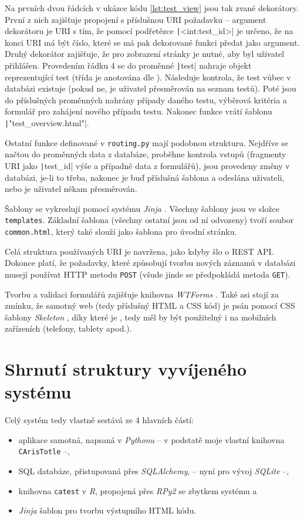 \documentclass[a4paper,twoside,12pt]{scrbook}
\begin{document}
Na prvních dvou řádcích v ukázce kódu \ref{lst:test_view} jsou tak zvané dekorátory. První z nich zajišťuje propojení s příslušnou URI požadavku -- argument dekorátoru je URI s tím, že pomocí podřetězce \texttt|<int:test_id>| je určeno, že na konci URI má být číslo, které se má pak dekorované funkci předat jako argument. Druhý dekorátor zajišťuje, že pro zobrazení stránky je nutné, aby byl uživatel přihlášen. Provedením řádku 4 se do proměnné \texttt|test| nahraje objekt reprezentující test (třída je anotována dle \cite{PEP484}). Následuje kontrola, že test vůbec v databázi existuje (pokud ne, je uživatel přesměrován na seznam testů). Poté jsou do příslušných proměnných nahrány případy daného testu, výběrová kritéria a formulář pro zahájení nového případu testu. Nakonec funkce vrátí  šablonu \texttt|"test_overview.html"|.

Ostatní funkce definované v \texttt{routing.py} mají podobnou strukturu. Nejdříve se načtou do proměnných data z databáze, proběhne kontrola vstupů (fragmenty URI jako \texttt|test_id| výše a případně data z formulářů), jsou provedeny změny v databázi, je-li to třeba, nakonec je buď  příslušná šablona a odeslána uživateli, nebo je uživatel někam přesměrován.

Šablony se vykreslují pomocí systému \textit{Jinja} \cite{jinja2}. Všechny šablony jsou ve složce \texttt{templates}. Základní šablona (všechny ostatní jsou od ní odvozeny) tvoří soubor \texttt{common.html}, který také slouží jako šablona pro úvodní stránku.

Celá struktura používaných URI je navržena, jako kdyby šlo o REST API. Dokonce platí, že požadavky, které způsobují tvorbu nových záznamů v databázi musejí používat HTTP metodu \texttt{POST} (všude jinde se předpokládá metoda \texttt{GET}).

Tvorbu a validaci formulářů zajišťuje knihovna \textit{WTForms} \cite{wtforms}. Také asi stojí za zmínku, že samotný web (tedy příslušný HTML a CSS kód) je psán pomocí CSS šablony \textit{Skeleton} \cite{skeleton.css}, díky které je , tedy měl by být použitelný i na mobilních zařízeních (telefony, tablety apod.).

\section{Shrnutí struktury vyvíjeného systému}
Celý systém tedy vlastně sestává ze 4 hlavních částí:
\begin{itemize}
	\item aplikace samotná, napsaná v \textit{Pythonu} -- v podstatě moje vlastní knihovna \texttt{CArisTotle} --,
	\item SQL databáze, přistupovaná přes \textit{SQLAlchemy}, -- nyní pro vývoj \textit{SQLite} --,
	\item knihovna \texttt{catest} v \textit{R}, propojená přes \textit{RPy2} se zbytkem systému a
	\item \textit{Jinja} šablon pro tvorbu výstupního HTML kódu.
\end{itemize}
\end{document}
